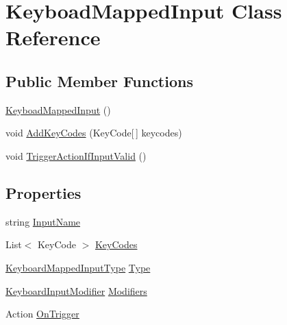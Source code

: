 \hypertarget{class_keyboad_mapped_input}{}\section{Keyboad\+Mapped\+Input Class Reference}
\label{class_keyboad_mapped_input}
\subsection*{Public Member Functions}
\begin{DoxyCompactItemize}
\item 
\hyperlink{class_keyboad_mapped_input_a6b4e13ca02f5099092e84720260bc8fc}{Keyboad\+Mapped\+Input} ()
\item 
void \hyperlink{class_keyboad_mapped_input_a603eb7465f60b5516d72338dc37ed11a}{Add\+Key\+Codes} (Key\+Code\mbox{[}$\,$\mbox{]} keycodes)
\item 
void \hyperlink{class_keyboad_mapped_input_ab3e7f6f8bb20962cca6290d9f24244c4}{Trigger\+Action\+If\+Input\+Valid} ()
\end{DoxyCompactItemize}
\subsection*{Properties}
\begin{DoxyCompactItemize}
\item 
string \hyperlink{class_keyboad_mapped_input_a5bebdabd33d5991f10a4c79cde47be8e}{Input\+Name}
\item 
List$<$ Key\+Code $>$ \hyperlink{class_keyboad_mapped_input_a1f48d4f64767a1edc557048c02b6fbb4}{Key\+Codes}
\item 
\hyperlink{_keyboard_mapped_input_type_8cs_ae342fcbcca71b2c821363b14ed799463}{Keyboard\+Mapped\+Input\+Type} \hyperlink{class_keyboad_mapped_input_aa47b55c92f30bb6d2b2715ac59a9872a}{Type}
\item 
\hyperlink{_keyboard_input_modifier_8cs_a45c5fbd3fc0bd2cbe0f27f511d6b5955}{Keyboard\+Input\+Modifier} \hyperlink{class_keyboad_mapped_input_a0f57bcd82b58feb7150568e8da9cc202}{Modifiers}
\item 
Action \hyperlink{class_keyboad_mapped_input_add1680f7a6942ded6a8838b18568e99c}{On\+Trigger}
\end{DoxyCompactItemize}


